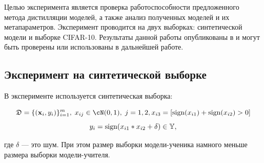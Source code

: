 \documentclass[12pt, twoside]{article}
\begin{document}
Целью эксперимента является проверка работоспособности предложенного метода дистилляции моделей, а также анализ полученных моделей и их метапараметров. Эксперимент проводится на двух выборках: синтетической модели и выборке CIFAR-10. Результаты данной работы опубликованы в \cite{distknow} и могут быть проверены или использованы в дальнейшей работе.

\subsection{Эксперимент на синтетической выборке}
В эксперименте используется синтетическая выборка:

$$\fD = \{(\bx_i, y_i)\}_{i=1}^{m},\; x_{ij} \in \cN(0, 1),\; j=1, 2, x_{i3} = [\text{sign}(x_{i1})+\text{sign}(x_{i2})>0]$$
$$y_i = \text{sign}(x_{i1}*x_{i2}+\delta) \in \mathbb{Y},$$

\noindent
где $\delta$ --- это шум. При этом размер выборки модели-ученика намного меньше размера выборки модели-учителя.

\end{document}
